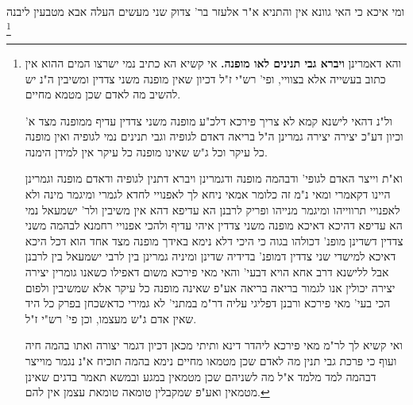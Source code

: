 \documentclass[12pt, openany]{book}
\newcommand{\footnotecomment}[1]{\footnote{#1}}
\newcommand{\commenta}[1]{\footnotecomment{#1}}
\begin{document}
{ומי איכא כי האי גוונא  אין והתניא א"ר אלעזר בר' צדוק שני מעשים העלה אבא מטבעין ליבנה  
\commenta{ והא דאמרינן \textbf{ויברא גבי תנינים לאו מופנה.}  אי קשיא הא כתיב נמי ישרצו המים ההוא אין כתוב בעשייה אלא בצוויי, ופי' רש"י ז"ל דכיון שאין מופנה משני צדדין ומשיבין ה"נ יש להשיב מה לאדם שכן מטמא מחיים.\par  ול"נ דהאי לישנא קמא לא צריך פירכא דלכ"ע מופנה משני צדדין עדיף ממופנה מצד א' וכיון דע"כ יצירה יצירה גמרינן ה"ל בריאה דאדם לגופיה וגבי תנינים נמי לגופיה ואין מופנה כל עיקר וכל ג"ש שאינו מופנה כל עיקר אין למידן הימנה.\par וא"ת וייצר האדם לגופי' ודבהמה מופנה ודגמרינן ויברא דתנין לגופיה ודאדם מופנה וגמרינן היינו דקאמרי ומאי נ"מ זה כלומר אמאי ניחא לך לאפנויי לחדא לגמרי ומיגמר מינה ולא לאפנויי תרווייהו ומיגמר מנייהו ופריק לרבנן הא עדיפא דהא אין משיבין ולר' ישמעאל נמי הא עדיפא דהיכא דאיכא מופנה משני צדדין איהי עדיף ולהכי אפנויי רחמנא לבהמה משני צדדין דשדינן מופנ' דכולהו בגוה כי היכי דלא נימא באידך מופנה מצד אחד הוא דכל היכא דאיכא למישדי שני צדדין דמופנ' בדידיה שדינן ומיניה גמרינן בין לרבי ישמעאל בין לרבנן אבל ללישנא דרב אחא הויא דבעי' והאי מאי פירכא משום דאפילו כשאנו גומרין יצירה יצירה יכולין אנו לגמור בריאה בריאה אע"פ שאינה מופנה כל עיקר אלא שמשיבין ולפום הכי בעי' מאי פירכא ורבנן דפליגי עליה דר"מ במתני' לא גמירי כדאשכחן בפרק כל היד שאין אדם ג"ש מעצמו, וכן פי' רש"י ז"ל.\par ואי קשיא לך לר"מ מאי פירכא ליהדר דינא ותיתי מכאן דכיון דגמר יצורה ואתו בהמה חיה ועוף כי פרכת גבי תנין מה לאדם שכן מטמאו מחיים נימא בהמה תוכיח א"נ נגמר מוייצר דבהמה למד מלמד א"ל מה לשניהם שכן מטמאין במגע ובמשא תאמר בדגים שאינן מטמאין ואע"פ שמקבלין טומאה טומאת עצמן אין להם. }

}
\end{document}

